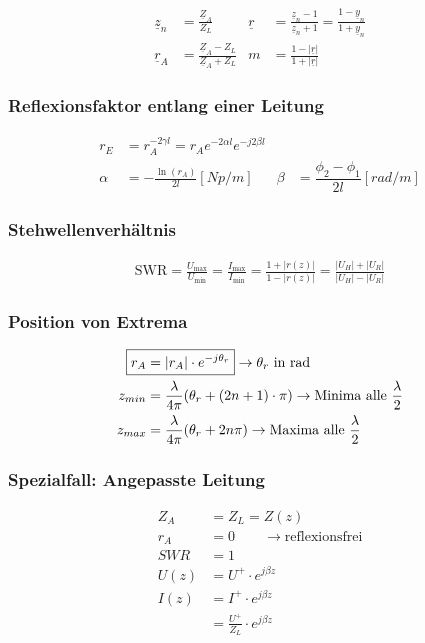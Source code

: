 \begin{align*}
    \underline{z}_n & = \frac{\underline{Z}_A}{Z_L}                     & \underline{r} & = \frac{\underline{z}_n-1}{\underline{z}_n+1}= \frac{1-\underline{y}_n}{1+\underline{y}_n} \\
    \underline{r}_A & = \frac{\underline{Z}_A-Z_L}{\underline{Z}_A+Z_L} & m             & = \frac{1-|\underline{r}|}{1+|\underline{r}|}
\end{align*}

\subsubsection{Reflexionsfaktor entlang einer Leitung}
\begin{align*}
    r_E    & = r_A  ^{-2\gamma l} = r_A  e^{-2\alpha l} e^{-j2\beta l}                                                     \\
    \alpha & = -\frac{\ln(r_A)}{2l} [\si{Np/m}]                        & \beta & = \dfrac{\phi_2 -\phi_1}{2l} [\si{rad/m}]
\end{align*}

\subsubsection{Stehwellenverhältnis}
\begin{align*}
    \mathrm{SWR} = \frac{U_\text{max}}{U_\text{min}} =
    \frac{I_\text{max}}{I_\text{min}} = \frac{1+|r(z)|}{1-|r(z)|} =
    \frac{|U_H|+|U_R|}{|U_H|-|U_R|}
\end{align*}

\subsubsection{Position von Extrema}
\begin{align*}
    \Aboxed{r_A & = |r_A|\cdot e^{-j\theta_r}}\rightarrow\theta_r\text{ in rad}                                 \\
    z_{min}     & =\frac{\lambda}{4\pi}(\theta_r+(2n+1)\cdot\pi)\rightarrow\text{Minima alle }\frac{\lambda}{2} \\
    z_{max}     & =\frac{\lambda}{4\pi}(\theta_r+2n\pi)\rightarrow\text{Maxima alle }\frac{\lambda}{2}
\end{align*}

\subsubsection{Spezialfall: Angepasste Leitung}
\begin{align*}
    Z_A  & = Z_L = Z(z)                              \\
    r_A  & = 0\qquad\rightarrow\text{reflexionsfrei} \\
    SWR  & = 1                                       \\
    U(z) & = U^+\cdot e ^{j\beta z}                  \\
    I(z) & = I^+ \cdot e^{j\beta z}                  \\
         & = \frac{U^+}{Z_L}\cdot e^{j\beta z}
\end{align*}

